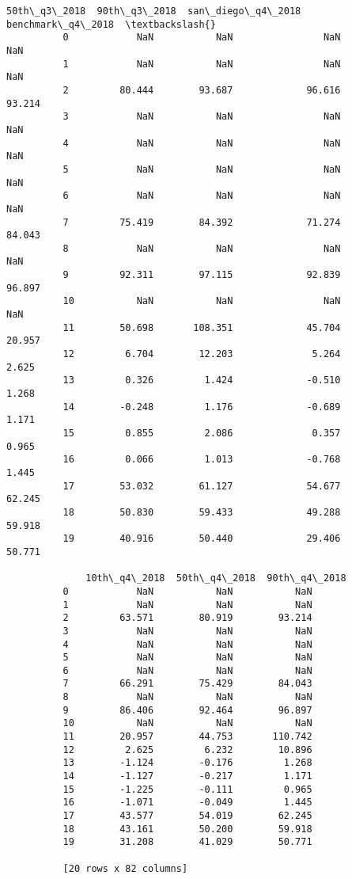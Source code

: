 \documentclass[11pt]{article}
\begin{document}
\begin{Verbatim}[commandchars=\\\{\}]
              50th\_q3\_2018  90th\_q3\_2018  san\_diego\_q4\_2018  benchmark\_q4\_2018  \textbackslash{}
          0            NaN           NaN                NaN                NaN   
          1            NaN           NaN                NaN                NaN   
          2         80.444        93.687             96.616             93.214   
          3            NaN           NaN                NaN                NaN   
          4            NaN           NaN                NaN                NaN   
          5            NaN           NaN                NaN                NaN   
          6            NaN           NaN                NaN                NaN   
          7         75.419        84.392             71.274             84.043   
          8            NaN           NaN                NaN                NaN   
          9         92.311        97.115             92.839             96.897   
          10           NaN           NaN                NaN                NaN   
          11        50.698       108.351             45.704             20.957   
          12         6.704        12.203              5.264              2.625   
          13         0.326         1.424             -0.510              1.268   
          14        -0.248         1.176             -0.689              1.171   
          15         0.855         2.086              0.357              0.965   
          16         0.066         1.013             -0.768              1.445   
          17        53.032        61.127             54.677             62.245   
          18        50.830        59.433             49.288             59.918   
          19        40.916        50.440             29.406             50.771   
          
              10th\_q4\_2018  50th\_q4\_2018  90th\_q4\_2018  
          0            NaN           NaN           NaN  
          1            NaN           NaN           NaN  
          2         63.571        80.919        93.214  
          3            NaN           NaN           NaN  
          4            NaN           NaN           NaN  
          5            NaN           NaN           NaN  
          6            NaN           NaN           NaN  
          7         66.291        75.429        84.043  
          8            NaN           NaN           NaN  
          9         86.406        92.464        96.897  
          10           NaN           NaN           NaN  
          11        20.957        44.753       110.742  
          12         2.625         6.232        10.896  
          13        -1.124        -0.176         1.268  
          14        -1.127        -0.217         1.171  
          15        -1.225        -0.111         0.965  
          16        -1.071        -0.049         1.445  
          17        43.577        54.019        62.245  
          18        43.161        50.200        59.918  
          19        31.208        41.029        50.771  
          
          [20 rows x 82 columns]
\end{Verbatim}
            

    
    
    
    
\end{document}
